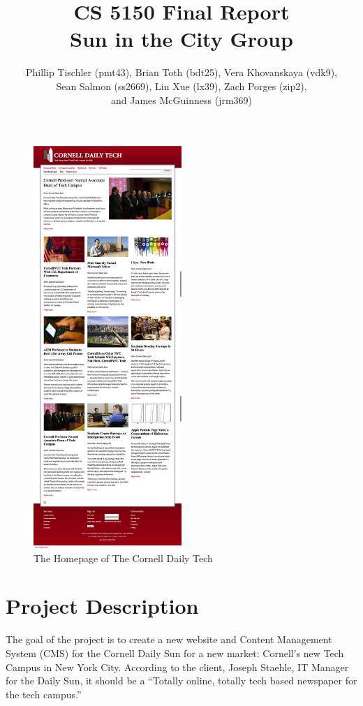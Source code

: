 \documentclass[10pt]{article} %
\title{CS 5150 Final Report \\ Sun in the City Group}
\author{Phillip Tischler (pmt43), Brian Toth (bdt25), Vera Khovanskaya (vdk9), \\ 
Sean Salmon (ss2669), Lin Xue (lx39), Zach Porges (zip2),  \\
and James McGuinness (jrm369)}
\begin{document}
\maketitle


\begin{figure}[h!]
\begin{center}
\includegraphics[height=6in]{images/screen_home}
\end{center}
\caption{The Homepage of The Cornell Daily Tech}
\end{figure}

\clearpage
\tableofcontents
\clearpage

\section{Project Description}

The goal of the project is to create a new website and Content Management System (CMS) for the Cornell Daily Sun for a new market: Cornell’s new Tech Campus in New York City. According to the client, Joseph Staehle, IT Manager for the Daily Sun, it should be a ``Totally online, totally tech based newspaper for the tech campus.”
\end{document}
